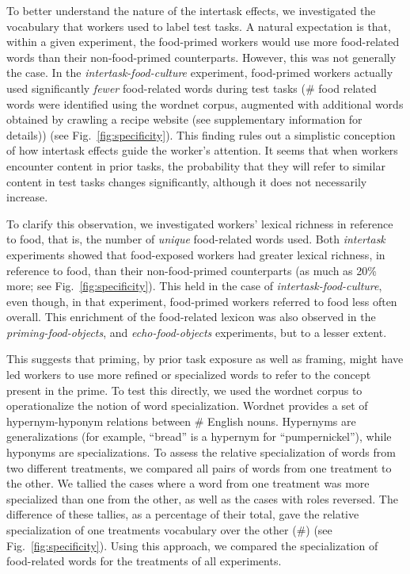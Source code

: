 \documentclass[12pt]{article}
\begin{document}
To better understand the nature of the 
intertask effects, we investigated the vocabulary
that workers used to label test tasks. A natural expectation is that, within
a given experiment, the food-primed workers would use more food-related words 
than their non-food-primed counterparts.  However, this was not generally 
the case. In the \textit{intertask-food-culture} experiment, food-primed
workers actually used significantly \textit{fewer} food-related words 
during test tasks
(\# food related words were identified using the wordnet corpus, augmented
with additional words obtained by crawling a recipe website (see supplementary
information for details)) (see Fig.~\ref{fig:specificity}).  This finding
rules out a simplistic conception of how intertask effects guide the worker's
attention.  It seems that when workers encounter content in 
prior tasks, the probability that they will refer to similar content in 
test tasks changes significantly, although it does not necessarily increase.

To clarify this observation, we investigated workers' lexical richness in 
reference to food, that is, the number of \textit{unique} food-related words
used.
Both \textit{intertask} experiments showed that food-exposed workers had 
greater lexical richness, in reference to food, than their non-food-primed 
counterparts (as much as 20\% more; see Fig.~\ref{fig:specificity}).  This
held in the case of \textit{intertask-food-culture}, even though, in that 
experiment, food-primed workers referred to food less often overall.  
This enrichment of the food-related lexicon 
was also observed in the \textit{priming-food-objects}, and 
\textit{echo-food-objects} experiments, but to a lesser extent.

This suggests that priming, by prior task exposure as well as framing,
might have led workers to use more refined or specialized words to refer to
the concept present in the prime.
To test this directly, we used the wordnet corpus to operationalize the 
notion of word specialization.
Wordnet provides a set of hypernym-hyponym relations between \# English 
nouns.  
Hypernyms are generalizations (for example, ``bread'' is a hypernym for 
``pumpernickel''), while hyponyms are specializations.
To assess the relative specialization of words from two different treatments,
we compared all pairs of words from one treatment to the other. 
We tallied the cases where a word from one treatment was more specialized
than one from the other, as well as the cases with roles reversed.  
The difference of these tallies, as a percentage of their total, gave the
relative specialization of one treatments vocabulary over the other
(\#) (see Fig.~\ref{fig:specificity}).  
Using this approach, we compared the specialization of food-related words 
for the treatments of all experiments.
\end{document}
